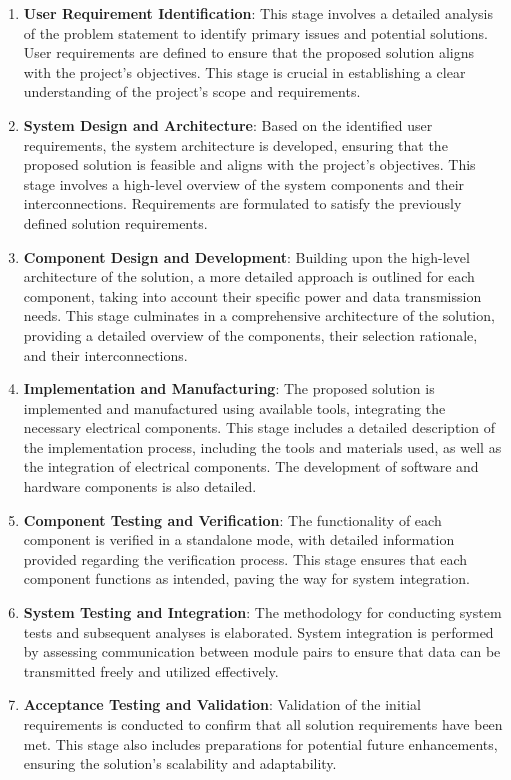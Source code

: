 \begin{enumerate}
	\item \textbf{User Requirement Identification}: This stage involves a detailed analysis of the problem statement to identify primary issues and potential solutions. User requirements are defined to ensure that the proposed solution aligns with the project's objectives. This stage is crucial in establishing a clear understanding of the project's scope and requirements.

	\item \textbf{System Design and Architecture}: Based on the identified user requirements, the system architecture is developed, ensuring that the proposed solution is feasible and aligns with the project's objectives. This stage involves a high-level overview of the system components and their interconnections. Requirements are formulated to satisfy the previously defined solution requirements.

	\item \textbf{Component Design and Development}: Building upon the high-level architecture of the solution, a more detailed approach is outlined for each component, taking into account their specific power and data transmission needs. This stage culminates in a comprehensive architecture of the solution, providing a detailed overview of the components, their selection rationale, and their interconnections.

	\item \textbf{Implementation and Manufacturing}: The proposed solution is implemented and manufactured using available tools, integrating the necessary electrical components. This stage includes a detailed description of the implementation process, including the tools and materials used, as well as the integration of electrical components. The development of software and hardware components is also detailed.

	\item \textbf{Component Testing and Verification}: The functionality of each component is verified in a standalone mode, with detailed information provided regarding the verification process. This stage ensures that each component functions as intended, paving the way for system integration.

	\item \textbf{System Testing and Integration}: The methodology for conducting system tests and subsequent analyses is elaborated. System integration is performed by assessing communication between module pairs to ensure that data can be transmitted freely and utilized effectively.

	\item \textbf{Acceptance Testing and Validation}: Validation of the initial requirements is conducted to confirm that all solution requirements have been met. This stage also includes preparations for potential future enhancements, ensuring the solution's scalability and adaptability.
\end{enumerate}

